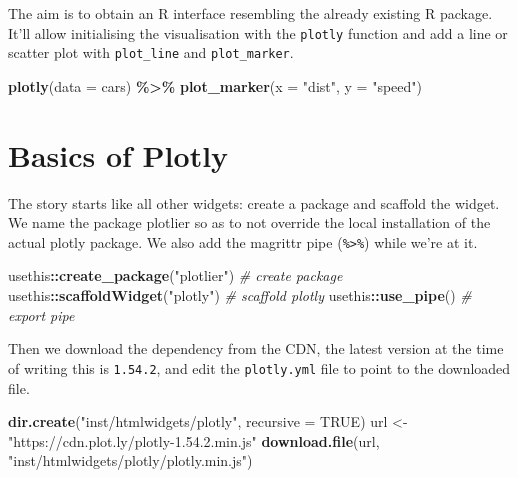 \documentclass[
]{krantz}
\makeatletter
\newenvironment{Shaded}{\begin{snugshade}}{\end{snugshade}}
\newcommand{\CommentTok}[1]{\textcolor[rgb]{0.37,0.37,0.37}{\textit{#1}}}
\newcommand{\DataTypeTok}[1]{\textcolor[rgb]{0.27,0.27,0.27}{#1}}
\newcommand{\KeywordTok}[1]{\textcolor[rgb]{0.27,0.27,0.27}{\textbf{#1}}}
\newcommand{\NormalTok}[1]{#1}
\newcommand{\OperatorTok}[1]{\textcolor[rgb]{0.43,0.43,0.43}{\textbf{#1}}}
\newcommand{\OtherTok}[1]{\textcolor[rgb]{0.37,0.37,0.37}{#1}}
\newcommand{\StringTok}[1]{\textcolor[rgb]{0.5,0.5,0.5}{#1}}
\newenvironment{kframe}{%
\medskip{}
\setlength{\fboxsep}{.8em}
 \def\at@end@of@kframe{}%
 \ifinner\ifhmode%
  \def\at@end@of@kframe{\end{minipage}}%
  \begin{minipage}{\columnwidth}%
 \fi\fi%
 \def\FrameCommand##1{\hskip\@totalleftmargin \hskip-\fboxsep
 \colorbox{shadecolor}{##1}\hskip-\fboxsep
     \hskip-\linewidth \hskip-\@totalleftmargin \hskip\columnwidth}%
 \MakeFramed {\advance\hsize-\width
   \@totalleftmargin\z@ \linewidth\hsize
   \@setminipage}}%
 {\par\unskip\endMakeFramed%
 \at@end@of@kframe}
\renewenvironment{Shaded}{\begin{kframe}}{\end{kframe}}
\makeatother
\begin{document}
The aim is to obtain an R interface resembling the already existing R package. It'll allow initialising the visualisation with the \texttt{plotly} function and add a line or scatter plot with \texttt{plot\_line} and \texttt{plot\_marker}.

\begin{Shaded}
\begin{Highlighting}[]
\KeywordTok{plotly}\NormalTok{(}\DataTypeTok{data =}\NormalTok{ cars) }\OperatorTok{\%\textgreater{}\%}\StringTok{ }
\StringTok{  }\KeywordTok{plot\_marker}\NormalTok{(}\DataTypeTok{x =} \StringTok{"dist"}\NormalTok{, }\DataTypeTok{y =} \StringTok{"speed"}\NormalTok{)}
\end{Highlighting}
\end{Shaded}

\hypertarget{widgets-ex-plotly-basics}{%
\section{Basics of Plotly}\label{widgets-ex-plotly-basics}}

The story starts like all other widgets: create a package and scaffold the widget. We name the package plotlier so as to not override the local installation of the actual plotly package. We also add the magrittr pipe (\texttt{\%\textgreater{}\%}) while we're at it.

\begin{Shaded}
\begin{Highlighting}[]
\NormalTok{usethis}\OperatorTok{::}\KeywordTok{create\_package}\NormalTok{(}\StringTok{"plotlier"}\NormalTok{) }\CommentTok{\# create package}
\NormalTok{usethis}\OperatorTok{::}\KeywordTok{scaffoldWidget}\NormalTok{(}\StringTok{"plotly"}\NormalTok{) }\CommentTok{\# scaffold plotly}
\NormalTok{usethis}\OperatorTok{::}\KeywordTok{use\_pipe}\NormalTok{() }\CommentTok{\# export pipe}
\end{Highlighting}
\end{Shaded}

Then we download the dependency from the CDN, the latest version at the time of writing this is \texttt{1.54.2}, and edit the \texttt{plotly.yml} file to point to the downloaded file.

\begin{Shaded}
\begin{Highlighting}[]
\KeywordTok{dir.create}\NormalTok{(}\StringTok{"inst/htmlwidgets/plotly"}\NormalTok{, }\DataTypeTok{recursive =} \OtherTok{TRUE}\NormalTok{)}
\NormalTok{url \textless{}{-}}\StringTok{ "https://cdn.plot.ly/plotly{-}1.54.2.min.js"}
\KeywordTok{download.file}\NormalTok{(url, }\StringTok{"inst/htmlwidgets/plotly/plotly.min.js"}\NormalTok{)}
\end{Highlighting}
\end{Shaded}
\end{document}
